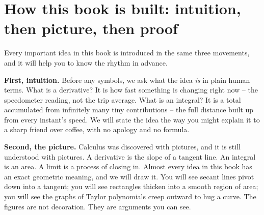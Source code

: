 \section*{How this book is built: intuition, then picture, then proof}

Every important idea in this book is introduced in the same three movements, and it will help you to
know the rhythm in advance.

\textbf{First, intuition.} Before any symbols, we ask what the idea \emph{is} in plain human terms.
What is a derivative? It is how fast something is changing right now -- the speedometer reading, not
the trip average. What is an integral? It is a total accumulated from infinitely many tiny
contributions -- the full distance built up from every instant's speed. We will state the idea the
way you might explain it to a sharp friend over coffee, with no apology and no formula.

\textbf{Second, the picture.} Calculus was discovered with pictures, and it is still understood with
pictures. A derivative is the slope of a tangent line. An integral is an area. A limit is a process
of closing in. Almost every idea in this book has an exact geometric meaning, and we will draw it.
You will see secant lines pivot down into a tangent; you will see rectangles thicken into a smooth
region of area; you will see the graphs of Taylor polynomials creep outward to hug a curve. The
figures are not decoration. They are arguments you can see.

